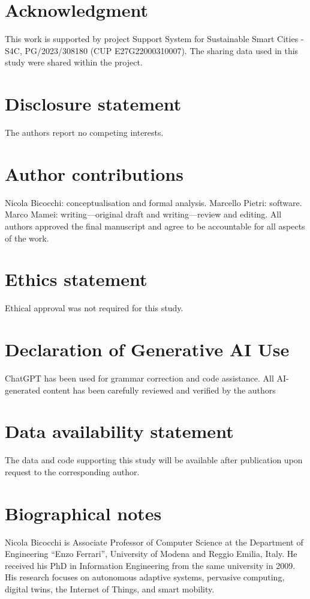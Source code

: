 \documentclass[]{interact}
\begin{document}
\section*{Acknowledgment}
This work is supported by project Support System for Sustainable Smart Cities - S4C, PG/2023/308180 (CUP E27G22000310007). The sharing data used in this study were shared within the project.

\section*{Disclosure statement}
The authors report no competing interests.

\section*{Author contributions}
Nicola Bicocchi: conceptualisation and formal analysis. Marcello Pietri: software. Marco Mamei: writing---original draft and writing---review and editing. All authors approved the final manuscript and agree to be accountable for all aspects of the work.

\section*{Ethics statement}
Ethical approval was not required for this study.

\section*{Declaration of Generative AI Use}
ChatGPT has been used for grammar correction and code assistance.
All AI-generated content has been carefully reviewed and verified by the authors

\section*{Data availability statement}
The data and code supporting this study will be available after publication upon request to the corresponding author.




\section*{Biographical notes}
Nicola Bicocchi is Associate Professor of Computer Science at the Department of Engineering ``Enzo Ferrari'', University of Modena and Reggio Emilia, Italy. He received his PhD in Information Engineering from the same university in 2009. His research focuses on autonomous adaptive systems, pervasive computing, digital twins, the Internet of Things, and smart mobility.
\end{document}
